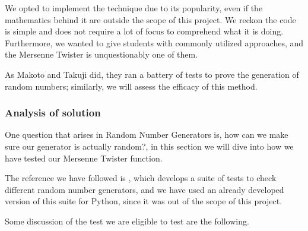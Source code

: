 We opted to implement the technique due to its popularity, even if the mathematics behind it are outside the scope of this project. We reckon the code is simple and does not require a lot of focus to comprehend what it is doing. Furthermore, we wanted to give students with commonly utilized approaches, and the Mersenne Twister is unquestionably one of them.

As Makoto and Takuji did, they ran a battery of tests to prove the generation of random numbers; similarly, we will assess the efficacy of this method.

\subsubsection{Analysis of solution}
One question that arises in Random Number Generators is, how can we make sure our generator is actually random?, in this section we will dive into how we have tested our Mersenne Twister function.

The reference we have followed is \cite{smid2010statistical}, which develops a suite of tests to check different random number generators, and we have used an already developed version of this suite for Python\cite{InsaneMonster2022}, since it was out of the scope of this project. 

Some discussion of the test we are eligible to test are the following.


